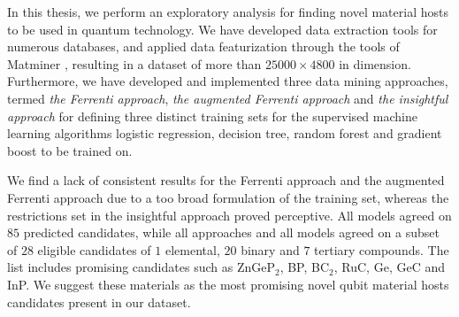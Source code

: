 In this thesis, we perform an exploratory analysis for finding novel material hosts to be used in quantum technology. We have developed data extraction tools for numerous databases, and applied data featurization through the tools of Matminer \cite{Ward2018}, resulting in a dataset of more than $25000\times4800$ in dimension. Furthermore, we have developed and implemented three data mining approaches, termed \textit{the Ferrenti approach}, \textit{the augmented Ferrenti approach} and \textit{the insightful approach} for defining three distinct training sets for the supervised machine learning algorithms logistic regression, decision tree, random forest and gradient boost to be trained on.

We find a lack of consistent results for the Ferrenti approach and the augmented Ferrenti approach due to a too broad formulation of the training set, whereas the restrictions set in the insightful approach proved perceptive. All models agreed on $85$ predicted candidates, while all approaches and all models agreed on a subset of $28$ eligible candidates of $1$ elemental, $20$ binary and $7$ tertiary compounds. The list includes promising candidates such as ZnGeP$_2$, BP, BC$_2$, RuC, Ge, GeC and InP. We suggest these materials as the most promising novel qubit material hosts candidates present in our dataset.
